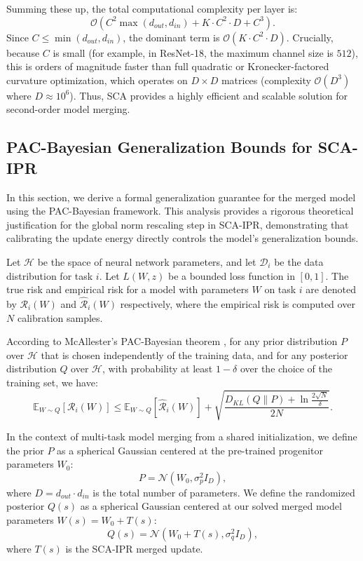 \documentclass{article}
\theoremstyle{plain}
\theoremstyle{definition}
\theoremstyle{remark}
\begin{document}
Summing these up, the total computational complexity per layer is:
\begin{equation}
    \mathcal{O}\left( C^2 \max(d_{out}, d_{in}) + K \cdot C^2 \cdot D + C^3 \right).
\end{equation}
Since $C \le \min(d_{out}, d_{in})$, the dominant term is $\mathcal{O}(K \cdot C^2 \cdot D)$. 
Crucially, because $C$ is small (for example, in ResNet-18, the maximum channel size is $512$), this is orders of magnitude faster than full quadratic or Kronecker-factored curvature optimization, which operates on $D \times D$ matrices (complexity $\mathcal{O}(D^3)$ where $D \approx 10^6$). 
Thus, SCA provides a highly efficient and scalable solution for second-order model merging.

\subsection{PAC-Bayesian Generalization Bounds for SCA-IPR}
\label{sec:appendix_pac}

In this section, we derive a formal generalization guarantee for the merged model using the PAC-Bayesian framework. This analysis provides a rigorous theoretical justification for the global norm rescaling step in SCA-IPR, demonstrating that calibrating the update energy directly controls the model's generalization bounds.

Let $\mathcal{H}$ be the space of neural network parameters, and let $\mathcal{D}_i$ be the data distribution for task $i$. Let $L(W, z)$ be a bounded loss function in $[0, 1]$. The true risk and empirical risk for a model with parameters $W$ on task $i$ are denoted by $\mathcal{R}_i(W)$ and $\widehat{\mathcal{R}}_i(W)$ respectively, where the empirical risk is computed over $N$ calibration samples.

According to McAllester's PAC-Bayesian theorem \cite{mcallester1999pac}, for any prior distribution $P$ over $\mathcal{H}$ that is chosen independently of the training data, and for any posterior distribution $Q$ over $\mathcal{H}$, with probability at least $1 - \delta$ over the choice of the training set, we have:
\begin{equation}
    \mathbb{E}_{W \sim Q}[\mathcal{R}_i(W)] \le \mathbb{E}_{W \sim Q}[\widehat{\mathcal{R}}_i(W)] + \sqrt{\frac{D_{KL}(Q \parallel P) + \ln \frac{2\sqrt{N}}{\delta}}{2N}}.
    \label{eq:mcallester}
\end{equation}

In the context of multi-task model merging from a shared initialization, we define the prior $P$ as a spherical Gaussian centered at the pre-trained progenitor parameters $W_0$:
\begin{equation}
    P = \mathcal{N}(W_0, \sigma_p^2 I_D),
\end{equation}
where $D = d_{out} \cdot d_{in}$ is the total number of parameters. 
We define the randomized posterior $Q(s)$ as a spherical Gaussian centered at our solved merged model parameters $W(s) = W_0 + T(s)$:
\begin{equation}
    Q(s) = \mathcal{N}(W_0 + T(s), \sigma_q^2 I_D),
\end{equation}
where $T(s)$ is the SCA-IPR merged update.
\end{document}
